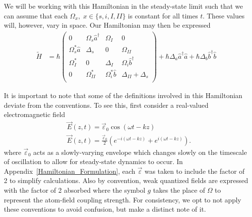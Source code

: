 \documentclass[aps,pra,showpacs,amsmath,amssymb,nofootinbib,longbibliography,superscriptaddress
]{revtex4-1}
\theoremstyle{definition}
\theoremstyle{remark}
\newcommand{\0}{\hat{0}}
\begin{document}
We will be working with this Hamiltonian in the steady-state limit such that we can assume that each $\Omega_x,\; x \in \{s, i, I, II\}$ is constant for all times $t$. These values will, however, vary in space. Our Hamiltonian may then be expressed
\begin{align}
    \tilde{H}
    &=
    \hbar \left(
        \begin{array}{cccc}
            0 & \Omega_{s} \hat{a}^{\dagger} & \Omega_{I} & 0\\
            \Omega_{s}^* \hat{a} & \Delta_s & 0 & \Omega_{II}\\
            \Omega_{I}^* & 0 & \Delta_I & \Omega_{i} \hat{b}^{\dagger}\\
            0 & \Omega_{II}^* & \Omega_{i}^* \hat{b} & \Delta_{II} + \Delta_s\\
        \end{array}
    \right) +
    \hbar \Delta_a \hat{a}^{\dagger}\hat{a} +
    \hbar \Delta_b  \hat{b}^{\dagger}\hat{b}
\end{align}


It is important to note that some of the definitions involved in this Hamiltonian deviate from the conventions. To see this, first consider a real-valued electromagnetic field
\begin{align}
    &\vec{E}(z, t) = \vec{\varepsilon}_0 \cos(\omega t - kz)\nonumber\\
    &\vec{E}(z, t) = \frac{\vec{\varepsilon}_0}{2} \left( e^{-i(\omega t - kz)} + e^{i(\omega t - kz)}\right).\nonumber
\end{align}
where $\vec{\varepsilon}_0$ acts as a slowly-varying envelope which changes slowly on the timescale of oscillation to allow for steady-state dynamics to occur. In Appendix~\ref{Hamiltonian_Formulation}, each $\vec{\varepsilon}$ was taken to include the factor of 2 to simplify calculations. Also by convention, weak quantized fields are expressed with the factor of 2 absorbed where the symbol $g$ takes the place of $\Omega$ to represent the atom-field coupling strength. For consistency, we opt to not apply these conventions to avoid confusion, but make a distinct note of it.
\end{document}
